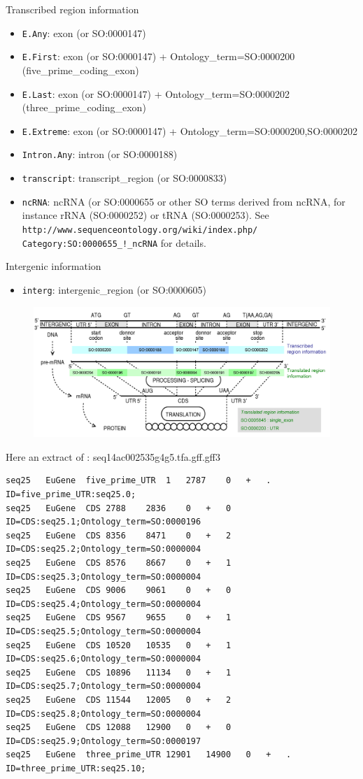 Transcribed region information
\begin{itemize}
\item \texttt{E.Any}: 		exon (or SO:0000147)
\item \texttt{E.First}: 	exon (or SO:0000147)	  + Ontology\_term=SO:0000200 (five\_prime\_coding\_exon)
\item \texttt{E.Last}: 		exon (or SO:0000147)	  + Ontology\_term=SO:0000202 (three\_prime\_coding\_exon)
\item \texttt{E.Extreme}: 	exon (or SO:0000147)	  + Ontology\_term=SO:0000200,SO:0000202
\item \texttt{Intron.Any}: 	intron (or SO:0000188)
\item \texttt{transcript}: transcript\_region (or SO:0000833)
\item \texttt{ncRNA}: 	        ncRNA (or SO:0000655 or other SO terms derived from ncRNA, for instance rRNA (SO:0000252) or tRNA (SO:0000253). 
See  \texttt{http://www.sequenceontology.org/wiki/index.php/} \texttt{Category:SO:0000655\_!\_ncRNA} for details.
\end{itemize}

Intergenic information
\begin{itemize}
\item \texttt{interg}: intergenic\_region (or SO:0000605)
\end{itemize}



\begin{figure}[h]
\includegraphics[width=17cm]{SO.png} 
\end{figure}

Here an extract of : seq14ac002535g4g5.tfa.gff.gff3
\begin{Verbatim}[fontsize=\tiny]
seq25	EuGene	five_prime_UTR	1	2787	0	+	.	ID=five_prime_UTR:seq25.0;
seq25	EuGene	CDS	2788	2836	0	+	0	ID=CDS:seq25.1;Ontology_term=SO:0000196
seq25	EuGene	CDS	8356	8471	0	+	2	ID=CDS:seq25.2;Ontology_term=SO:0000004
seq25	EuGene	CDS	8576	8667	0	+	1	ID=CDS:seq25.3;Ontology_term=SO:0000004
seq25	EuGene	CDS	9006	9061	0	+	0	ID=CDS:seq25.4;Ontology_term=SO:0000004
seq25	EuGene	CDS	9567	9655	0	+	1	ID=CDS:seq25.5;Ontology_term=SO:0000004
seq25	EuGene	CDS	10520	10535	0	+	1	ID=CDS:seq25.6;Ontology_term=SO:0000004
seq25	EuGene	CDS	10896	11134	0	+	1	ID=CDS:seq25.7;Ontology_term=SO:0000004
seq25	EuGene	CDS	11544	12005	0	+	2	ID=CDS:seq25.8;Ontology_term=SO:0000004
seq25	EuGene	CDS	12088	12900	0	+	0	ID=CDS:seq25.9;Ontology_term=SO:0000197
seq25	EuGene	three_prime_UTR	12901	14900	0	+	.	ID=three_prime_UTR:seq25.10;
\end{Verbatim}

